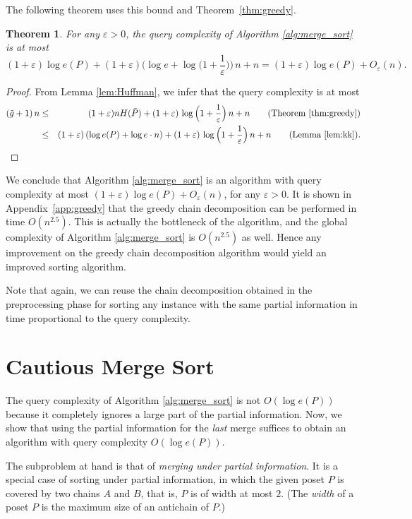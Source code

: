 \documentclass{article} \usepackage{fullpage}
\newtheorem{theorem}{Theorem}
\begin{document}
The following theorem uses this bound and Theorem~\ref{thm:greedy}.
\begin{theorem}
\label{thm:nearopt}
For any $\varepsilon >0$, the query complexity of Algorithm \ref{alg:merge_sort} is at most
$$
(1+\varepsilon) \log e(P) + (1+\varepsilon) \Big(\log e + \log \Big(1+\frac{1}{\varepsilon}\Big)\Big)\,n + n = 
(1+\varepsilon) \log e(P) + O_\varepsilon(n).
$$
\end{theorem}

\begin{proof}
From Lemma \ref{lem:Huffman}, we infer that the query complexity is at most
\begin{eqnarray*}
(\tilde{g} + 1)\,n
& \leq & (1+\varepsilon) nH(\bar{P}) + (1+\varepsilon)\,\log \Big(1+\frac{1}{\varepsilon}\Big)\,n + n \qquad \text{(Theorem~\ref{thm:greedy})}\\
& \leq & (1+\varepsilon)\,(\log e(P) + \log e \cdot n) + (1+\varepsilon)\,\log \Big(1+\frac{1}{\varepsilon}\Big)\,n + n\qquad \text{(Lemma \ref{lem:kk})}.
\end{eqnarray*}
\end{proof}
We conclude that Algorithm \ref{alg:merge_sort} is an algorithm with query complexity at most $(1+\varepsilon)\log e(P) + O_\varepsilon(n)$, for any $\varepsilon > 0$. It is shown in Appendix~\ref{app:greedy} that the greedy chain decomposition can be performed in time $O(n^{2.5})$. This is actually the bottleneck of the algorithm, and the global complexity of Algorithm \ref{alg:merge_sort} is $O(n^{2.5})$ as well. Hence any improvement on the greedy chain decomposition algorithm would yield an improved sorting algorithm.

Note that again, we can reuse the chain decomposition obtained in the preprocessing phase for sorting any instance with the same partial information in time proportional to the query complexity.

\section{Cautious Merge Sort}
\label{sec:cautious_merge}

The query complexity of Algorithm \ref{alg:merge_sort} is not $O(\log e(P))$ because it completely ignores a large part of the partial information. Now, we show that using the partial information for the {\sl last\/} merge suffices to obtain an algorithm with query complexity $O(\log e(P))$.

The subproblem at hand is that of {\sl merging under partial information\/}. It is a special case of sorting under partial information, in which the given poset $P$ is covered by two chains $A$ and $B$, that is, $P$ is of width at most $2$. (The {\sl width\/} of a poset $P$ is the maximum size of an antichain of $P$.)
\end{document}

